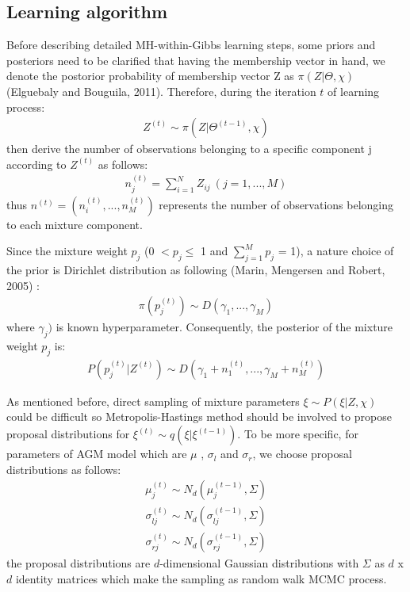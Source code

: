 \documentclass[conference]{IEEEtran}
\begin{document}
\subsection{Learning algorithm}
Before describing detailed MH-within-Gibbs learning steps, some priors and posteriors need to be clarified that having the membership vector in hand,  we denote the postorior probability of membership vector Z as $\pi(Z|\Theta,\chi)$ (Elguebaly and Bouguila, 2011)\cite{b7}. Therefore, during the iteration $t$ of learning process:
\begin{align}
Z^{(t)} \sim \pi(Z|\Theta^{(t-1)},\chi)
\label{eq:5}
\end{align}
then derive the number of observations belonging to a specific component j according to $Z^{(t)}$ as follows:
\begin{align}
n_j^{(t)} = \sum_{i=1}^NZ_{ij}\ (j = 1,...,M) 
\label{eq:6}
\end{align}
thus $n^{(t)}=(n_i^{(t)},...,n_M^{(t)})$ represents the number of observations belonging to each mixture component.

Since the mixture weight $p_j$ (0 $< p_j \leq$ 1 and $\sum_{j=1}^Mp_j$ = 1), a nature choice of the prior is Dirichlet distribution as following (Marin, Mengersen and Robert, 2005) \cite{b8}: 
\begin{align}
\pi(p_j^{(t)}) \sim \textit{D}(\gamma_1,...,\gamma_M )
\label{eq:7}
\end{align}
where $\gamma_j)$ is known hyperparameter. Consequently, the posterior of the mixture weight $p_j$ is:
\begin{align}
P(p_j^{(t)}|Z^{(t)}) \sim \textit{D}(\gamma_1 + n_1^{(t)},...,\gamma_M + n_M^{(t)})
\label{eq:8}
\end{align}


As mentioned before, direct sampling of mixture parameters $\xi \sim P(\xi|Z,\chi)$ could be difficult so Metropolis-Hastings method should be involved to propose proposal distributions for $\xi^{(t)} \sim q(\xi|\xi^{(t-1)})$. To be more specific, for parameters of AGM model which are $\mu$ , $\sigma_l$ and $\sigma_r$, we choose proposal distributions as follows:
\begin{align}
\mu_j^{(t)} \sim \textit{N}_d(\mu_j^{(t-1)},\Sigma)
\label{eq:9}
\end{align}
\begin{align}
\sigma_{lj}^{(t)} \sim \textit{N}_d(\sigma_{lj}^{(t-1)},\Sigma)
\label{eq:10}
\end{align}
\begin{align}
\sigma_{rj}^{(t)} \sim \textit{N}_d(\sigma_{rj}^{(t-1)},\Sigma)
\label{eq:11}
\end{align}
the proposal distributions are $d$-dimensional Gaussian distributions with $\Sigma$ as $d$ x $d$ identity matrices which make the sampling as random walk MCMC process.
\end{document}
